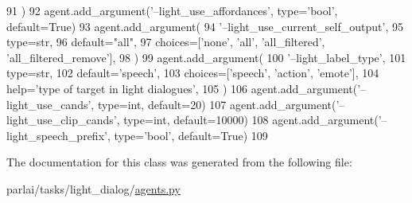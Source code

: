 \begin{DoxyCode}
91         )
92         agent.add\_argument(\textcolor{stringliteral}{'--light\_use\_affordances'}, type=\textcolor{stringliteral}{'bool'}, default=\textcolor{keyword}{True})
93         agent.add\_argument(
94             \textcolor{stringliteral}{'--light\_use\_current\_self\_output'},
95             type=str,
96             default=\textcolor{stringliteral}{"all"},
97             choices=[\textcolor{stringliteral}{'none'}, \textcolor{stringliteral}{'all'}, \textcolor{stringliteral}{'all\_filtered'}, \textcolor{stringliteral}{'all\_filtered\_remove'}],
98         )
99         agent.add\_argument(
100             \textcolor{stringliteral}{'--light\_label\_type'},
101             type=str,
102             default=\textcolor{stringliteral}{'speech'},
103             choices=[\textcolor{stringliteral}{'speech'}, \textcolor{stringliteral}{'action'}, \textcolor{stringliteral}{'emote'}],
104             help=\textcolor{stringliteral}{'type of target in light dialogues'},
105         )
106         agent.add\_argument(\textcolor{stringliteral}{'--light\_use\_cands'}, type=int, default=20)
107         agent.add\_argument(\textcolor{stringliteral}{'--light\_use\_clip\_cands'}, type=int, default=10000)
108         agent.add\_argument(\textcolor{stringliteral}{'--light\_speech\_prefix'}, type=\textcolor{stringliteral}{'bool'}, default=\textcolor{keyword}{True})
109 
\end{DoxyCode}


The documentation for this class was generated from the following file\+:\begin{DoxyCompactItemize}
\item 
parlai/tasks/light\+\_\+dialog/\hyperlink{parlai_2tasks_2light__dialog_2agents_8py}{agents.\+py}\end{DoxyCompactItemize}
